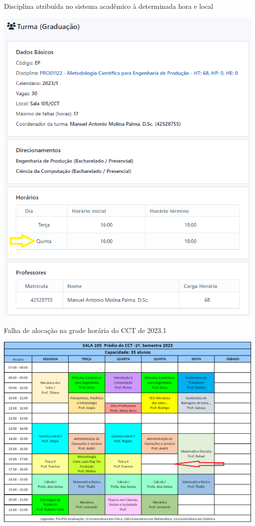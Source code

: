 \begin{MyCenteredFigure} \caption{Disciplina atribuída no sistema acadêmico à determinada hora e local} \label{fig:Academico}
  \includegraphics[width=\textwidth]{files/img/2.02!3-organizacao/2.02!3.1.5-erros/Metodologia-Quinta}
\end{MyCenteredFigure}    %

\begin{MyCenteredFigure} \caption{Falha de alocação na grade horária do CCT de 2023.1} \label{fig:CCT}
  \includegraphics[width=\textwidth]{files/img/2.02!3-organizacao/2.02!3.1.5-erros/Aulas-CCT-105-2023_1}
\end{MyCenteredFigure}    %

